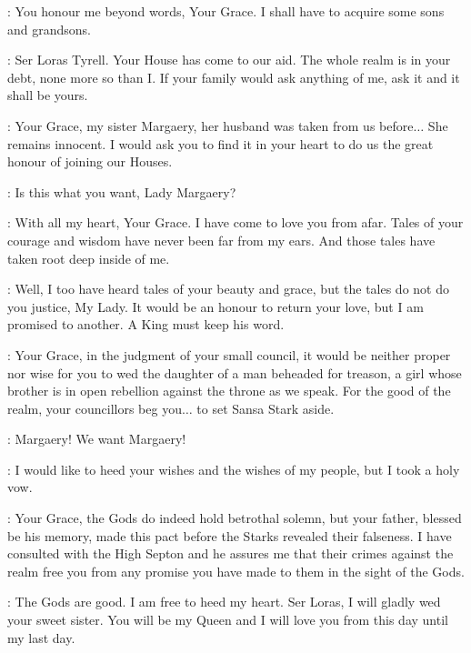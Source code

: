 \LITTLEFINGER: You honour me beyond words, Your Grace. I shall have to acquire some sons and grandsons. 


\JOFFREY: Ser Loras Tyrell. Your House has come to our aid. The whole realm is in your debt, none more so than I. If your family would ask anything of me, ask it and it shall be yours. 

\LORAS: Your Grace, my sister Margaery, her husband was taken from us before$\ldots$ She remains innocent. I would ask you to find it in your heart to do us the great honour of joining our Houses. 

\JOFFREY: Is this what you want, Lady Margaery?

\MARGAERY: With all my heart, Your Grace. I have come to love you from afar. Tales of your courage and wisdom have never been far from my ears. And those tales have taken root deep inside of me. 

\JOFFREY: Well, I too have heard tales of your beauty and grace, but the tales do not do you justice, My Lady. It would be an honour to return your love, but I am promised to another. A King must keep his word. 

\CERSEI: Your Grace, in the judgment of your small council, it would be neither proper nor wise for you to wed the daughter of a man beheaded for treason, a girl whose brother is in open rebellion against the throne as we speak. For the good of the realm, your councillors beg you$\ldots$ to set Sansa Stark aside. 

\CROWD:  Margaery! We want Margaery! 

\JOFFREY: I would like to heed your wishes and the wishes of my people, but I took a holy vow. 

\PYCELLE: Your Grace, the Gods do indeed hold betrothal solemn, but your father, blessed be his memory, made this pact before the Starks revealed their falseness. I have consulted with the High Septon and he assures me that their crimes against the realm free you from any promise you have made to them in the sight of the Gods. 

\JOFFREY:  The Gods are good. I am free to heed my heart. Ser Loras, I will gladly wed your sweet sister.  You will be my Queen and I will love you from this day until my last day. 


